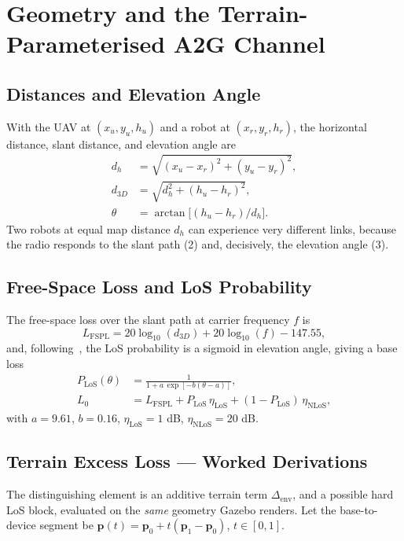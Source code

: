 \documentclass[conference]{IEEEtran}
\begin{document}
\section{Geometry and the Terrain-Parameterised A2G Channel}
\label{sec:channel}

\subsection{Distances and Elevation Angle}
With the UAV at $(x_u,y_u,h_u)$ and a robot at $(x_r,y_r,h_r)$, the horizontal
distance, slant distance, and elevation angle are
\begin{align}
d_h &= \sqrt{(x_u-x_r)^2 + (y_u-y_r)^2},\\
d_{3D} &= \sqrt{d_h^2 + (h_u-h_r)^2},\\
\theta &= \arctan\!\big[(h_u-h_r)/d_h\big].
\end{align}
Two robots at equal map distance $d_h$ can experience very different links, because
the radio responds to the slant path (2) and, decisively, the elevation angle (3).

\subsection{Free-Space Loss and LoS Probability}
The free-space loss over the slant path at carrier frequency $f$ is
\begin{equation}
L_{\mathrm{FSPL}} = 20\log_{10}(d_{3D}) + 20\log_{10}(f) - 147.55,
\end{equation}
and, following~\cite{alhourani2014optimal}, the LoS probability is a sigmoid in
elevation angle, giving a base loss
\begin{align}
P_{\mathrm{LoS}}(\theta) &= \frac{1}{1 + a\,\exp[-b(\theta-a)]},\\
L_0 &= L_{\mathrm{FSPL}} + P_{\mathrm{LoS}}\,\eta_{\mathrm{LoS}}
       + (1-P_{\mathrm{LoS}})\,\eta_{\mathrm{NLoS}},
\end{align}
with $a=9.61$, $b=0.16$, $\eta_{\mathrm{LoS}}=1$ dB, $\eta_{\mathrm{NLoS}}=20$ dB.

\subsection{Terrain Excess Loss --- Worked Derivations}
The distinguishing element is an additive terrain term
$\Delta_{\mathrm{env}}$, and a possible hard LoS block, evaluated on the \emph{same}
geometry Gazebo renders. Let the base-to-device segment be $\mathbf{p}(t) =
\mathbf{p}_0 + t(\mathbf{p}_1-\mathbf{p}_0)$, $t\in[0,1]$.
\end{document}
